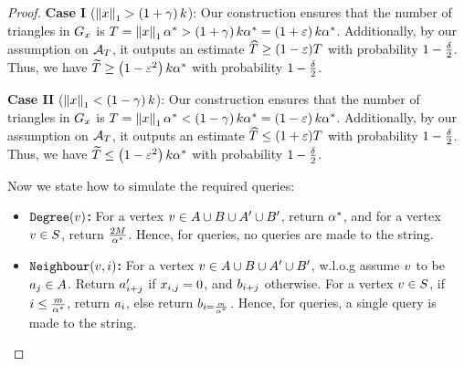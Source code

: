\begin{proof}
    {\bf Case I }($\left\|{x}\right\|_1 > \left({1+\gamma}\right)k$): Our construction ensures that the number of triangles in ${G_{x}}$ is $T = \left\|{x}\right\|_1\alpha^* > \left({1+\gamma}\right)k\alpha^* = \left({1+\varepsilon}\right)k\alpha^*$. Additionally, by our assumption on $\mathcal{A}_{T}$, it outputs an estimate $\widehat{T} \geq (1-\varepsilon)T$ with probability $1 - \frac{\delta}{2}$. Thus, we have $\widetilde{T} \geq \left({1 - \varepsilon^2}\right)k\alpha^*$ with probability $1-\frac{\delta}{2}$.

    {\bf Case II }($\left\|{x}\right\|_1 < \left({1-\gamma}\right)k$): Our construction ensures that the number of triangles in ${G_{x}}$ is $T = \left\|{x}\right\|_1\alpha^* < \left({1-\gamma}\right)k\alpha^* = \left({1-\varepsilon}\right)k\alpha^*$. Additionally, by our assumption on $\mathcal{A}_{T}$, it outputs an estimate $\widehat{T} \leq (1+\varepsilon)T$ with probability $1 - \frac{\delta}{2}$. Thus, we have $\widetilde{T} \leq \left({1 - \varepsilon^2}\right)k\alpha^*$ with probability $1-\frac{\delta}{2}$.

    Now we state how to simulate the required queries:
    \begin{itemize}
        \item \textbf{$\texttt{Degree}{\left({v}\right)}$:} For a vertex $v \in A\cup B\cup A'\cup B'$, return $\alpha^*$, and for a vertex $v \in S$, return $\frac{2M}{\alpha^*}$. Hence, for \degreeq{} queries, no queries are made to the string.
        

        \item \textbf{$\texttt{Neighbour}{\left({v,i}\right)}$:} For a vertex $v \in A\cup B\cup A'\cup B'$, w.l.o.g assume $v$ to be $a_j \in A$. Return $a'_{i+j}$ if $x_{i,j} = 0$, and $b_{i+j}$ otherwise. For a vertex $v \in S$, if $i \leq \frac{m}{\alpha^*}$, return $a_{i}$, else return $b_{i = \frac{m}{\alpha^*}}$. Hence, for \neighbourq{} queries, a single query is made to the string.
        

\end{itemize}
\end{proof}
